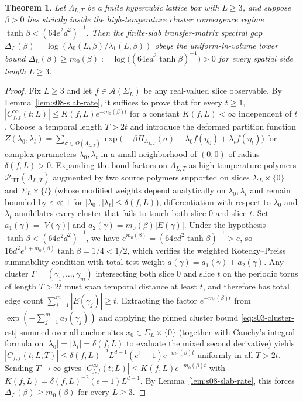 \documentclass[11pt]{article}
\newtheorem{theorem}{Theorem}[section]
\theoremstyle{definition}
\begin{document}
\begin{theorem}
\label{thm:s08-massgap}
Let $\Lambda_{L,T}$ be a finite hypercubic lattice box with $L \ge 3$, and suppose
$\beta > 0$ lies strictly inside the high-temperature cluster convergence regime
$\tanh \beta < (64 e^2 d^2)^{-1}$. Then the finite-slab transfer-matrix spectral gap
$\Delta_L(\beta) = \log(\lambda_0(L, \beta) / \lambda_1(L, \beta))$ obeys the
uniform-in-volume lower bound $\Delta_L(\beta) \ge m_0(\beta) := \log\!\bigl((64 e
d^2 \tanh \beta)^{-1}\bigr) > 0$ for every spatial side length $L \ge 3$.
\end{theorem}
\begin{proof}
Fix $L \ge 3$ and let $f \in \mathcal{A}(\Sigma_L)$ be any real-valued slice
observable. By Lemma~\ref{lem:s08-slab-rate}, it suffices to prove that for every $t
\ge 1$, $|C_{f,f}^\infty(t; L)| \le K(f, L) e^{-m_0(\beta) t}$ for a constant $K(f,
L) < \infty$ independent of $t$. Choose a temporal length $T > 2t$ and introduce the
deformed partition function $Z(\lambda_0, \lambda_t) = \sum_{\sigma \in
\Omega(\Lambda_{L,T})} \exp\!\bigl(-\beta H_{\Lambda_{L,T}}(\sigma) + \lambda_0
f(\eta_0) + \lambda_t f(\eta_t)\bigr)$ for complex parameters $\lambda_0, \lambda_t$
in a small neighborhood of $(0, 0)$ of radius $\delta(f, L) > 0$. Expanding the bond
factors on $\Lambda_{L,T}$ as high-temperature polymers
$\mathcal{P}_{\mathrm{HT}}(\Lambda_{L,T})$ augmented by two source polymers
supported on slices $\Sigma_L \times \{0\}$ and $\Sigma_L \times \{t\}$ (whose
modified weights depend analytically on $\lambda_0, \lambda_t$ and remain bounded by
$\varepsilon \ll 1$ for $|\lambda_0|, |\lambda_t| \le \delta(f, L)$),
differentiation with respect to $\lambda_0$ and $\lambda_t$ annihilates every
cluster that fails to touch both slice $0$ and slice $t$. Set $a_1(\gamma) =
|V(\gamma)|$ and $a_2(\gamma) = m_0(\beta) |E(\gamma)|$. Under the hypothesis $\tanh
\beta < (64 e^2 d^2)^{-1}$, we have $e^{m_0(\beta)} = (64 e d^2 \tanh \beta)^{-1} >
e$, so $16 d^2 e^{1 + m_0(\beta)} \tanh \beta = 1/4 < 1/2$, which verifies the
weighted Kotecky--Preiss summability condition with total test weight $a(\gamma) =
a_1(\gamma) + a_2(\gamma)$. Any cluster $\Gamma = (\gamma_1, \dots, \gamma_m)$
intersecting both slice $0$ and slice $t$ on the periodic torus of length $T > 2t$
must span temporal distance at least $t$, and therefore has total edge count
$\sum_{j=1}^m |E(\gamma_j)| \ge t$. Extracting the factor $e^{-m_0(\beta) t}$ from
$\exp(-\sum_{j=1}^m a_2(\gamma_j))$ and applying the pinned cluster bound
\eqref{eq:s03-cluster-est} summed over all anchor sites $x_0 \in \Sigma_L \times
\{0\}$ (together with Cauchy's integral formula on $|\lambda_0| = |\lambda_t| =
\delta(f, L)$ to evaluate the mixed second derivative) yields $|C_{f,f}(t; L, T)|
\le \delta(f, L)^{-2} L^{d-1} (e^1 - 1) e^{-m_0(\beta) t}$ uniformly in all $T >
2t$. Sending $T \to \infty$ gives $|C_{f,f}^\infty(t; L)| \le K(f, L) e^{-m_0(\beta)
t}$ with $K(f, L) = \delta(f, L)^{-2} (e - 1) L^{d-1}$. By
Lemma~\ref{lem:s08-slab-rate}, this forces $\Delta_L(\beta) \ge m_0(\beta)$ for
every $L \ge 3$.
\end{proof}
\end{document}
